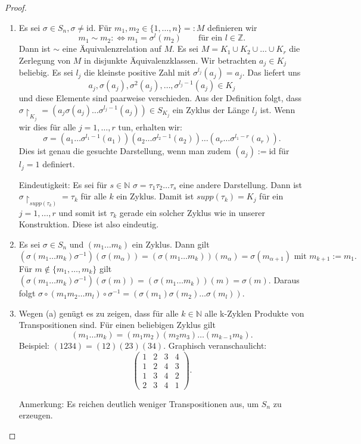 \documentclass[12pt]{scrartcl}%
\theoremstyle{definition}
\theoremstyle{remark}
\newcommand{\Inv}[1]{#1^{-1}}
\begin{document}
\begin{proof}
\begin{enumerate}[label=(\alph*)]
    \item Es sei $\sigma\in S_n, \sigma\neq\text{id}$. Für $m_1,m_2\in\{1,\dots,n\}=:M$ definieren wir 
    \[m_1\sim m_2 :\Leftrightarrow m_1 = \sigma^l(m_2)\qquad\text{für ein }l\in\mathbb{Z}.\]
    Dann ist $\sim$ eine Äquivalenzrelation auf $M$. Es sei $M = K_1\cup K_2\cup\dots\cup K_r$ die Zerlegung von $M$ in disjunkte Äquivalenzklassen. Wir betrachten $a_j\in K_j$ beliebig. Es sei $l_j$ die kleinste positive Zahl mit $\sigma^{l_j}(a_j) = a_j$. Das liefert uns
    \[a_j,\sigma(a_j),\sigma^2(a_j),\dots,\sigma^{l_j-1}(a_j)\in K_j\]
    und diese Elemente sind paarweise verschieden. Aus der Definition folgt, dass $\sigma\upharpoonright_{K_j}=(a_j\sigma(a_j)\dots\sigma^{l_j-1}(a_j))\in S_{K_j}$ ein Zyklus der Länge $l_j$ ist. Wenn wir dies für alle $j=1,\dots,r$ tun, erhalten wir:
    \[\sigma = (a_1\dots\sigma^{l_1-1}(a_1))(a_2\dots\sigma^{l_2-1}(a_2))\dots(a_r\dots\sigma^{l_1-r}(a_r)).\]
    Dies ist genau die gesuchte Darstellung, wenn man zudem $(a_j):=\text{id}$ für $l_j = 1$ definiert.

    Eindeutigkeit: Es sei für $s\in\mathbb{N}$ $\sigma = \tau_1\tau_2\dots\tau_s$ eine andere Darstellung. Dann ist $\sigma\upharpoonright_{supp(\tau_k)} = \tau_k$ für alle $k$ ein Zyklus. Damit ist $supp(\tau_k) = K_j$ für ein $j=1,\dots,r$ und somit ist $\tau_k$ gerade ein solcher Zyklus wie in unserer Konstruktion. Diese ist also eindeutig.

    \item Es sei $\sigma\in S_n$ und $(m_1\dots m_k)$ ein Zyklus. Dann gilt
    \[(\sigma(m_1\dots m_k)\Inv\sigma)(\sigma(m_{\alpha}))=(\sigma(m_1\dots m_k))(m_{\alpha}) = \sigma(m_{\alpha+1})\text{ mit }m_{k+1}:=m_1.\] 
    Für $m\notin \{m_1,\dots,m_k\}$ gilt $(\sigma(m_1\dots m_k)\sigma^{-1})(\sigma(m))=(\sigma(m_1\dots m_k))(m) = \sigma(m)$. Daraus folgt $\sigma\circ(m_1m_2\dots m_l)\circ\sigma^{-1} = (\sigma(m_1)\sigma(m_2)\dots\sigma(m_l))$.

    \item Wegen (a) genügt es zu zeigen, dass für alle $k\in\mathbb{N}$ alle k-Zyklen Produkte von Transpositionen sind. Für einen beliebigen Zyklus gilt
    \[(m_1\dots m_k) = (m_1m_2)(m_2m_3)\dots (m_{k-1}m_k).\]
    Beispiel: $(1234) = (12)(23)(34)$. Graphisch veranschaulicht:
    \[\begin{pmatrix}
        1 & 2 & 3 & 4 \\ %
        1 & 2 & 4 & 3 \\ %
        1 & 3 & 4 & 2 \\ %
        2 & 3 & 4 & 1
    \end{pmatrix}.\]
    
    Anmerkung: Es reichen deutlich weniger Transpositionen aus, um $S_n$ zu erzeugen.
\end{enumerate}

\end{proof}
\end{document}
